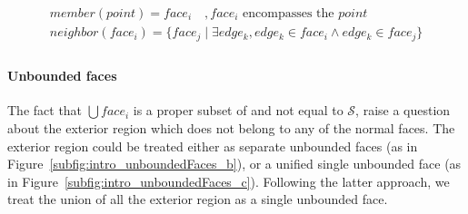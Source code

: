 \[
\begin{array}{l}
  \mathit{member}\left(point\right) = face_i \quad, face_i \text{ encompasses the } point \\
  \mathit{neighbor}\left(face_i\right) = \lbrace  face_j \mid \exists edge_k, edge_k \in face_i \land edge_k \in face_j \rbrace\\
\end{array}
\]

\paragraph{Unbounded faces}
The fact that $\bigcup face_i$ is a proper subset of and not equal to $\mathcal{S}$, raise a question about the exterior region which does not belong to any of the normal faces.
The exterior region could be treated either as separate unbounded faces (as in Figure~\ref{subfig:intro_unboundedFaces_b}), or a unified single unbounded face (as in Figure~\ref{subfig:intro_unboundedFaces_c}).
Following the latter approach, we treat the union of all the exterior region as a single unbounded face.

